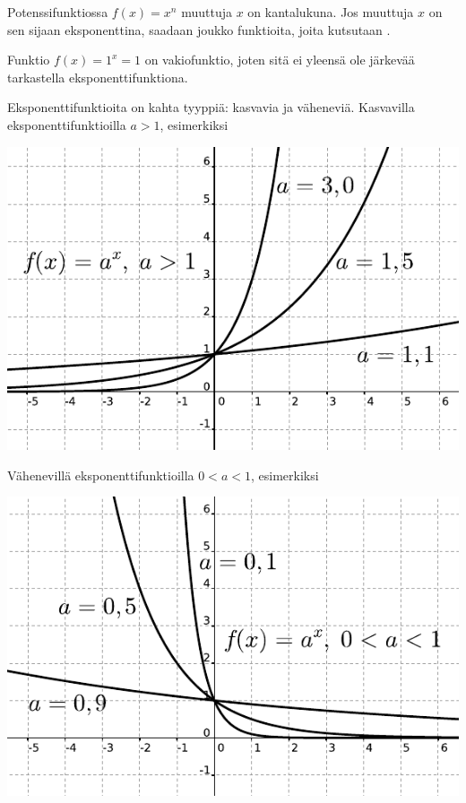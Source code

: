 Potenssifunktiossa $f(x) = x^n$ muuttuja $x$ on kantalukuna. Jos muuttuja
$x$ on sen sijaan eksponenttina, saadaan joukko funktioita, joita
kutsutaan .


Funktio $f(x) = 1^x = 1$ on vakiofunktio, joten sitä ei yleensä ole järkevää tarkastella eksponenttifunktiona.

Eksponenttifunktioita on kahta tyyppiä: kasvavia ja väheneviä.
Kasvavilla eksponenttifunktioilla $a>1$, esimerkiksi

\begin{center}
\includegraphics{pictures/apotenssiinxaisompikuinyksi.pdf}
\end{center}

Vähenevillä eksponenttifunktioilla $0<a<1$, esimerkiksi

\begin{center}
\includegraphics{pictures/apotenssiinxaisompikuinnolla.pdf}
\end{center}

